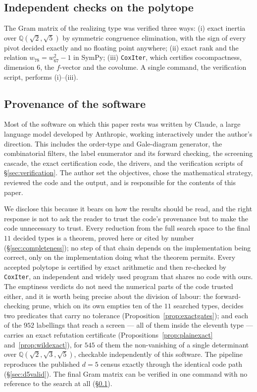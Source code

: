 \documentclass[11pt,reqno]{amsart}
\theoremstyle{plain}
\theoremstyle{definition}
\newcommand{\QQ}{\mathbb{Q}}
\newcommand{\NumRequired}{11}
\newcommand{\PlainRejected}{545}
\newcommand{\NumAssignments}{952}
\begin{document}
\subsection{Independent checks on the polytope}
\label{sec:checks}
The Gram matrix of the realizing type was verified three ways: (i) exact inertia
over $\QQ(\sqrt2,\sqrt5)$ by symmetric congruence elimination, with the sign of
every pivot decided exactly and no floating point anywhere;
(ii) exact rank and the relation $w_{78}=w_{67}^2-1$ in SymPy; (iii)
\texttt{CoxIter}, which certifies cocompactness, dimension $6$, the $f$-vector
and the covolume. A single command, the verification script,
performs (i)--(iii).

\subsection{Provenance of the software}
\label{sec:provenance}

Most of the software on which this paper rests was written by Claude, a large
language model developed by Anthropic, working interactively under the author's
direction. This includes the order-type and Gale-diagram generator, the
combinatorial filters, the label enumerator and its forward checking, the
screening cascade, the exact certification code, the drivers, and the
verification scripts of \S\ref{sec:verification}. The author set the objectives,
chose the mathematical strategy, reviewed the code and the output, and is
responsible for the contents of this paper.

We disclose this because it bears on how the results should be read, and the
right response is not to ask the reader to trust the code's provenance but to
make the code unnecessary to trust. Every reduction from the full search space to
the final $\NumRequired$ decided types is a theorem, proved here or cited by
number (\S\ref{sec:completeness}); no step of that chain depends on the
implementation being correct, only on the implementation doing what the theorem
permits. Every accepted polytope is certified by exact arithmetic and then
re-checked by \texttt{CoxIter}, an independent and widely used program that
shares no code with ours. The emptiness verdicts do not need the numerical parts of
the code trusted either, and it is worth being precise about the division of
labour: the forward-checking prune, which on its own empties ten of the
$\NumRequired$ searched types, decides two predicates that carry no tolerance
(Proposition~\ref{prop:exactgates}); and each of the $\NumAssignments$ labellings
that reach a screen --- all of them inside the eleventh type --- carries an exact
refutation certificate (Propositions~\ref{prop:plainexact}
and~\ref{prop:wildexact}), for $\PlainRejected$ of them the non-vanishing of a
single determinant over $\QQ(\sqrt2,\sqrt3,\sqrt5)$, checkable independently of
this software.
The pipeline reproduces the published $d=5$ census
exactly through the identical code path (\S\ref{sec:d5valid}). The final Gram
matrix can be verified in one command with no reference to the search at all
(\S\ref{sec:checks}).
\end{document}
